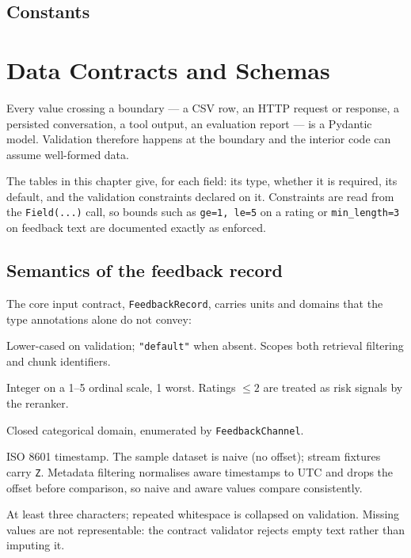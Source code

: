 \section{Constants}



\chapter{Data Contracts and Schemas}
\label{ch:schemas}

Every value crossing a boundary --- a CSV row, an HTTP request or response, a
persisted conversation, a tool output, an evaluation report --- is a Pydantic
model. Validation therefore happens at the boundary and the interior code can
assume well-formed data.

The tables in this chapter give, for each field: its type, whether it is
required, its default, and the validation constraints declared on it. Constraints
are read from the \texttt{Field(...)} call, so bounds such as
\texttt{ge=1, le=5} on a rating or \texttt{min\_length=3} on feedback text are
documented exactly as enforced.

\section{Semantics of the feedback record}

The core input contract, \texttt{FeedbackRecord}, carries units and domains
that the type annotations alone do not convey:

\begin{description}[nosep]
  \item[\texttt{tenant\_id}] Lower-cased on validation; \texttt{"default"} when
    absent. Scopes both retrieval filtering and chunk identifiers.
  \item[\texttt{rating}] Integer on a 1--5 ordinal scale, 1 worst. Ratings
    $\leq 2$ are treated as risk signals by the reranker.
  \item[\texttt{channel}] Closed categorical domain, enumerated by
    \texttt{FeedbackChannel}.
  \item[\texttt{created\_at}] ISO 8601 timestamp. The sample dataset is naive
    (no offset); stream fixtures carry \texttt{Z}. Metadata filtering
    normalises aware timestamps to UTC and drops the offset before comparison,
    so naive and aware values compare consistently.
  \item[\texttt{text}] At least three characters; repeated whitespace is
    collapsed on validation. Missing values are not representable: the contract
    validator rejects empty text rather than imputing it.
\end{description}

